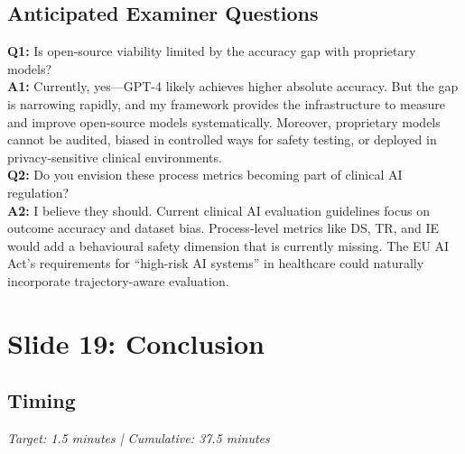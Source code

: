 \subsection*{Anticipated Examiner Questions}
\begin{qabox}
\textbf{Q1:} Is open-source viability limited by the accuracy gap with proprietary models? \\
\textbf{A1:} Currently, yes---GPT-4 likely achieves higher absolute accuracy. But the gap is narrowing rapidly, and my framework provides the infrastructure to measure and improve open-source models systematically. Moreover, proprietary models cannot be audited, biased in controlled ways for safety testing, or deployed in privacy-sensitive clinical environments. \\[6pt]
\textbf{Q2:} Do you envision these process metrics becoming part of clinical AI regulation? \\
\textbf{A2:} I believe they should. Current clinical AI evaluation guidelines focus on outcome accuracy and dataset bias. Process-level metrics like DS, TR, and IE would add a behavioural safety dimension that is currently missing. The EU AI Act's requirements for ``high-risk AI systems'' in healthcare could naturally incorporate trajectory-aware evaluation.
\end{qabox}



\section{Slide 19: Conclusion}

\subsection*{Timing}
\textit{Target: 1.5 minutes | Cumulative: 37.5 minutes}

